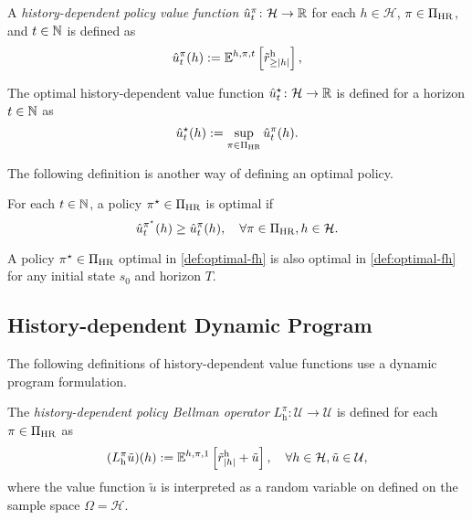 \begin{definition} \label{def:u-pi}
A \emph{history-dependent policy value function} $\hat{u}^{\pi}_t\colon \mathcal{H} \to \mathbb{R}$ for each $h\in \mathcal{H}$, $\pi \in \Pi_{\mathrm{HR}}$, and $t\in \mathbb{N}$ is defined as
  \[
   \hat{u}^{\pi}_t(h) := \mathbb{E}^{h, \pi, t} \left[ \tilde{r}^{\mathrm{h}}_{\ge |h|} \right],
 \]
\end{definition}


\begin{definition}
The optimal history-dependent value function $\hat{u}_t^{\star}\colon \mathcal{H} \to \mathbb{R}$ is defined for a horizon $t\in \mathbb{N}$ as
 \[
  \hat{u}^{\star}_t(h) := \sup_{\pi\in \Pi_{\mathrm{HR}}} \hat{u}_t^{\pi}(h). 
 \] 
\end{definition}

The following definition is another way of defining an optimal policy.
\begin{definition} \label{def:optimal-fh}
For each $t\in \mathbb{N}$, a policy $\pi^{\star} \in \Pi_{\mathrm{HR}}$ is optimal if
\[
   \hat{u}_t^{\pi^{\star}}(h) \ge \hat{u}_t^{\pi}(h), \quad \forall \pi \in \Pi_{\mathrm{HR}}, h\in \mathcal{H}.
 \]
\end{definition}

\begin{theorem} \label{def:optimalvf-imp-optimal}
A policy $\pi^{\star} \in \Pi_{\mathrm{HR}}$ optimal in \cref{def:optimal-fh} is also optimal in \cref{def:optimal-fh} for any initial state $s_0$ and horizon $T$.
\end{theorem}

\subsection{History-dependent Dynamic Program}

The following definitions of history-dependent value functions use a dynamic program formulation.

\begin{definition} \label{def:DPhpi}
The \emph{history-dependent policy Bellman operator} $L_{\mathrm{h}}^{\pi} \colon \mathcal{U} \to \mathcal{U}$ is defined for each $\pi\in \Pi_{\mathrm{HR}}$ as
  \[
    (L_{\mathrm{h}}^{\pi} \tilde{u}) (h)
    :=
    \mathbb{E}^{h, \pi, 1} \left[ \tilde{r}^{\mathrm{h}}_{|h|} + \tilde{u} \right], \quad \forall h\in \mathcal{H}, \tilde{u} \in \mathcal{U},
  \]
  where the value function $\tilde{u}$ is interpreted as a random variable on defined on the sample space $\Omega = \mathcal{H}$.
\end{definition}

